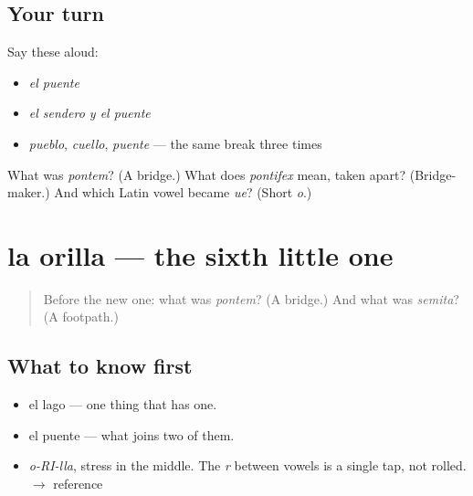 \subsection*{Your turn}
Say these aloud:

\begin{itemize}
\raggedright
  \item \emph{el puente}
  \item \emph{el sendero y el puente}
  \item \emph{pueblo}, \emph{cuello}, \emph{puente} — the same break three times
\end{itemize}

\begin{tcolorbox}[breakable,colback=teal!4,colframe=teal!35!black,title={Before you move on}]
What was \emph{pontem}? (A bridge.) What does \emph{pontifex} mean, taken apart? (Bridge-maker.) And which Latin vowel became \emph{ue}? (Short \emph{o}.)
\end{tcolorbox}
\section[la orilla]{la orilla — the sixth little one}

\label{lesson:ES-C295-orilla}



\begin{quote}
Before the new one: what was \emph{pontem}? (A bridge.) And what was \emph{semita}? (A footpath.)
\end{quote}

\subsection*{What to know first}
\begin{itemize}
\raggedright
  \item el lago — one thing that has one.
  \item el puente — what joins two of them.
\end{itemize}

\begin{sounds}
\begin{itemize}
\raggedright
  \item \emph{o-RI-lla}, stress in the middle. The \emph{r} between vowels is a single tap, not rolled. $\to$ reference
\end{itemize}
\end{sounds}

